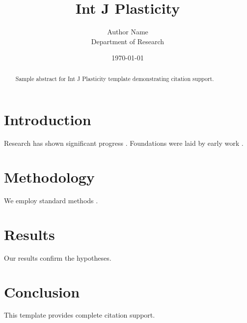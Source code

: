 ﻿\documentclass{elsarticle}
\title{Int J Plasticity}
\author{Author Name \\ \small Department of Research}
\date{\today}
\begin{document}
\maketitle

\begin{abstract}
Sample abstract for Int J Plasticity template demonstrating citation support.
\end{abstract}

\section{Introduction}
Research has shown significant progress \citep{einstein1905}. Foundations were laid by early work \citep{turing1950}.

\section{Methodology}
We employ standard methods \citep{knuth1984}.

\section{Results}
Our results confirm the hypotheses.

\section{Conclusion}
This template provides complete citation support.



\end{document}
